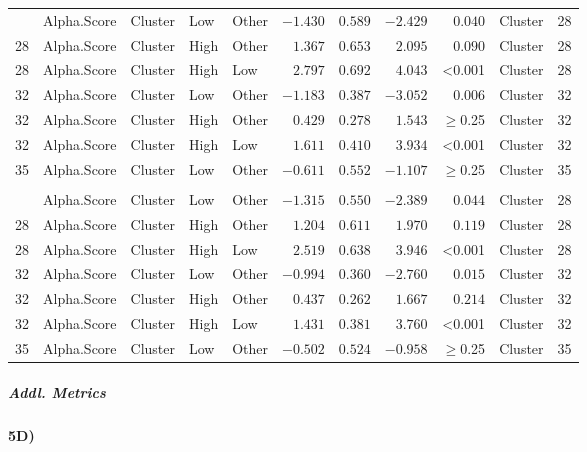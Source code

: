 \documentclass[
]{article}
\begin{document}
\begin{longtable}{cllllrrrrlc}
\midrule\addlinespace[2.5pt]
\multicolumn{11}{l}{Richness} \\ 
\midrule\addlinespace[2.5pt]
28 & Alpha.Score & Cluster & Low & Other & $-1.430$ & $0.589$ & $-2.429$ & $0.040$ & Cluster & 28 \\ 
28 & Alpha.Score & Cluster & High & Other & $1.367$ & $0.653$ & $2.095$ & $0.090$ & Cluster & 28 \\ 
28 & Alpha.Score & Cluster & High & Low & $2.797$ & $0.692$ & $4.043$ & <0.001 & Cluster & 28 \\ 
32 & Alpha.Score & Cluster & Low & Other & $-1.183$ & $0.387$ & $-3.052$ & $0.006$ & Cluster & 32 \\ 
32 & Alpha.Score & Cluster & High & Other & $0.429$ & $0.278$ & $1.543$ & $\geq$0.25 & Cluster & 32 \\ 
32 & Alpha.Score & Cluster & High & Low & $1.611$ & $0.410$ & $3.934$ & <0.001 & Cluster & 32 \\ 
35 & Alpha.Score & Cluster & Low & Other & $-0.611$ & $0.552$ & $-1.107$ & $\geq$0.25 & Cluster & 35 \\ 
\midrule\addlinespace[2.5pt]
\multicolumn{11}{l}{Phylogenetic} \\ 
\midrule\addlinespace[2.5pt]
28 & Alpha.Score & Cluster & Low & Other & $-1.315$ & $0.550$ & $-2.389$ & $0.044$ & Cluster & 28 \\ 
28 & Alpha.Score & Cluster & High & Other & $1.204$ & $0.611$ & $1.970$ & $0.119$ & Cluster & 28 \\ 
28 & Alpha.Score & Cluster & High & Low & $2.519$ & $0.638$ & $3.946$ & <0.001 & Cluster & 28 \\ 
32 & Alpha.Score & Cluster & Low & Other & $-0.994$ & $0.360$ & $-2.760$ & $0.015$ & Cluster & 32 \\ 
32 & Alpha.Score & Cluster & High & Other & $0.437$ & $0.262$ & $1.667$ & $0.214$ & Cluster & 32 \\ 
32 & Alpha.Score & Cluster & High & Low & $1.431$ & $0.381$ & $3.760$ & <0.001 & Cluster & 32 \\ 
35 & Alpha.Score & Cluster & Low & Other & $-0.502$ & $0.524$ & $-0.958$ & $\geq$0.25 & Cluster & 35 \\ 
\bottomrule
\end{longtable}

\subparagraph{Addl. Metrics}\label{addl.-metrics-10}

\paragraph{5D)}\label{d-2}
\end{document}
